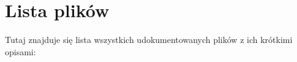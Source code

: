 \section{\-Lista plików}
\-Tutaj znajduje się lista wszystkich udokumentowanych plików z ich krótkimi opisami\-:\begin{DoxyCompactList}
\item{}
\item{}
\end{DoxyCompactList}
